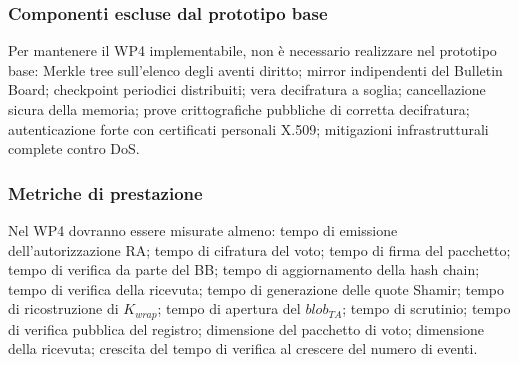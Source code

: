 \documentclass[12pt,a4paper]{article}
\begin{document}
\subsubsection*{Componenti escluse dal prototipo base}

Per mantenere il WP4 implementabile, non \`e necessario realizzare nel prototipo base: Merkle tree sull'elenco degli aventi diritto; mirror indipendenti del Bulletin Board; checkpoint periodici distribuiti; vera decifratura a soglia; cancellazione sicura della memoria; prove crittografiche pubbliche di corretta decifratura; autenticazione forte con certificati personali X.509; mitigazioni infrastrutturali complete contro DoS.

\subsubsection*{Metriche di prestazione}

Nel WP4 dovranno essere misurate almeno: tempo di emissione dell'autorizzazione RA; tempo di cifratura del voto; tempo di firma del pacchetto; tempo di verifica da parte del BB; tempo di aggiornamento della hash chain; tempo di verifica della ricevuta; tempo di generazione delle quote Shamir; tempo di ricostruzione di $K_{\mathit{wrap}}$; tempo di apertura del $\mathit{blob}_{\mathit{TA}}$; tempo di scrutinio; tempo di verifica pubblica del registro; dimensione del pacchetto di voto; dimensione della ricevuta; crescita del tempo di verifica al crescere del numero di eventi.

\newpage


\end{document}
